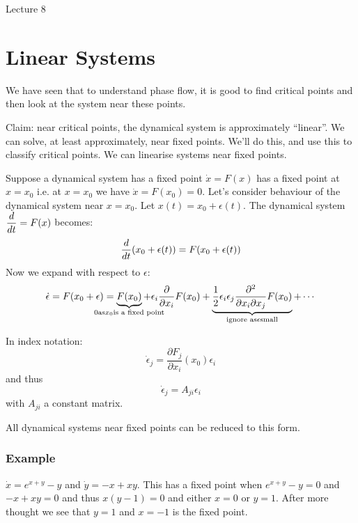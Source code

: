 \begin{center}

Lecture 8

\end{center}

\section{Linear Systems}

We have seen that to understand phase flow, it is good to find critical points and then look at the system near these points.

\vspace{\baselineskip}

Claim: near critical points, the dynamical system is approximately ``linear''. We can solve, at least approximately, near fixed points. We'll do this, and use this to classify critical points. We can linearise systems near fixed points. 

Suppose a dynamical system has a fixed point $\dot{x} = F(x)$ has a fixed point at $x=x_0$ i.e. at $x=x_0$ we have $\dot{x} = F(x_0) = 0$. Let's consider behaviour of the dynamical system near $x=x_0$. Let $x(t) = x_0 + \epsilon(t)$. The dynamical system $\dfrac{d }{d t} = F(x)$ becomes: $$\dfrac{d }{d t} (x_0 + \epsilon(t)) = F(x_0 + \epsilon(t))$$ Now we expand with respect to $\epsilon$:
$$\dot{\epsilon} = F(x_0 + \epsilon) = \underbrace{F(x_0)}_{\mathclap{0 \text{as} x_0 \text{is a fixed point}}} + \epsilon_i \pd{}{x_i} F(x_0) + \underbrace{\frac{1}{2} \epsilon_i \epsilon_j \frac{\partial^2}{\partial x_i \partial x_j} F(x_0)}_{\mathclap{\text{ignore as} \epsilon \text{small}}} + \cdots$$

In index notation: $$\dot{\epsilon}_j = \frac{\partial F_j}{\partial x_i} (x_0) \epsilon_i$$ and thus $$\dot{\epsilon}_j = A_{ji} \epsilon_i$$ with $A_{ji}$ a constant matrix.

All dynamical systems near fixed points can be reduced to this form.

\subsubsection*{Example}

$\dot{x} = e^{x+y} - y$ and $\dot{y} = -x + xy$. This has a fixed point when $e^{x+y} - y = 0$ and $-x + xy = 0$ and thus $x(y-1) = 0$ and either $x=0$ or $y=1$. After more thought we see that $y=1$ and $x=-1$ is the fixed point.


